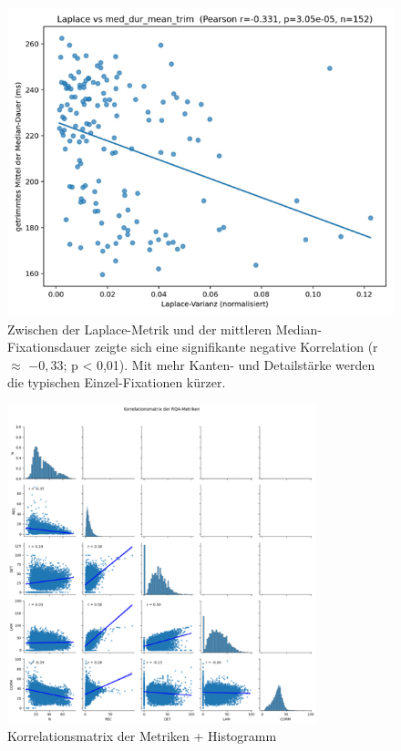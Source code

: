 \documentclass[
    language=german, %
    thesis=seminar, %
    supervisor=postdoc, %
    multiauthor=true, %
    ]{settings/csssa-thesis}
\begin{document}
\begin{figure}[h]
    \centering
    \includegraphics[width=\linewidth,height=0.8\textheight,keepaspectratio]{figures/Bild9.png}
    \caption{Zwischen der Laplace-Metrik und der mittleren Median-Fixationsdauer zeigte sich eine signifikante negative Korrelation (r $\approx$ $-0,33$; p < 0,01). Mit mehr Kanten- und Detailstärke werden die typischen Einzel-Fixationen kürzer.
  }\label{fig:bild9}
\end{figure}
\begin{figure}[ht]
    \centering
    \includegraphics[width=0.8\textwidth,height=0.8\textheight,keepaspectratio]{figures/Bild13.png}
    \caption{Korrelationsmatrix der Metriken + Histogramm}\label{fig:Bild12}
\end{figure}
\end{document}
